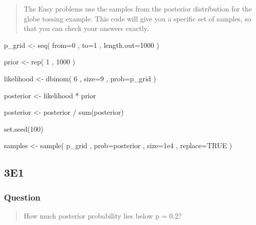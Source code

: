 \documentclass[
]{book}
\newenvironment{Shaded}{\begin{snugshade}}{\end{snugshade}}
\newcommand{\AttributeTok}[1]{\textcolor[rgb]{0.77,0.63,0.00}{#1}}
\newcommand{\ConstantTok}[1]{\textcolor[rgb]{0.00,0.00,0.00}{#1}}
\newcommand{\DecValTok}[1]{\textcolor[rgb]{0.00,0.00,0.81}{#1}}
\newcommand{\FloatTok}[1]{\textcolor[rgb]{0.00,0.00,0.81}{#1}}
\newcommand{\FunctionTok}[1]{\textcolor[rgb]{0.00,0.00,0.00}{#1}}
\newcommand{\NormalTok}[1]{#1}
\newcommand{\OtherTok}[1]{\textcolor[rgb]{0.56,0.35,0.01}{#1}}
\newcommand{\SpecialCharTok}[1]{\textcolor[rgb]{0.00,0.00,0.00}{#1}}
\begin{document}
\begin{quote}
The Easy problems use the samples from the posterior distribution for the globe tossing example. This code will give you a specific set of samples, so that you can check your answers exactly.
\end{quote}

\begin{Shaded}
\begin{Highlighting}[]
\NormalTok{p\_grid }\OtherTok{\textless{}{-}} \FunctionTok{seq}\NormalTok{( }\AttributeTok{from=}\DecValTok{0}\NormalTok{ , }\AttributeTok{to=}\DecValTok{1}\NormalTok{ , }\AttributeTok{length.out=}\DecValTok{1000}\NormalTok{ ) }

\NormalTok{prior }\OtherTok{\textless{}{-}} \FunctionTok{rep}\NormalTok{( }\DecValTok{1}\NormalTok{ , }\DecValTok{1000}\NormalTok{ ) }

\NormalTok{likelihood }\OtherTok{\textless{}{-}} \FunctionTok{dbinom}\NormalTok{( }\DecValTok{6}\NormalTok{ , }\AttributeTok{size=}\DecValTok{9}\NormalTok{ , }\AttributeTok{prob=}\NormalTok{p\_grid ) }

\NormalTok{posterior }\OtherTok{\textless{}{-}}\NormalTok{ likelihood }\SpecialCharTok{*}\NormalTok{ prior}

\NormalTok{posterior }\OtherTok{\textless{}{-}}\NormalTok{ posterior }\SpecialCharTok{/} \FunctionTok{sum}\NormalTok{(posterior)}

\FunctionTok{set.seed}\NormalTok{(}\DecValTok{100}\NormalTok{) }

\NormalTok{samples }\OtherTok{\textless{}{-}} \FunctionTok{sample}\NormalTok{( p\_grid , }\AttributeTok{prob=}\NormalTok{posterior , }\AttributeTok{size=}\FloatTok{1e4}\NormalTok{ , }\AttributeTok{replace=}\ConstantTok{TRUE}\NormalTok{ )}
\end{Highlighting}
\end{Shaded}

\hypertarget{e1-1}{%
\subsection*{3E1}\label{e1-1}}

\hypertarget{question-15}{%
\subsubsection*{Question}\label{question-15}}

\begin{quote}
How much posterior probability lies below p = 0.2?
\end{quote}
\end{document}
